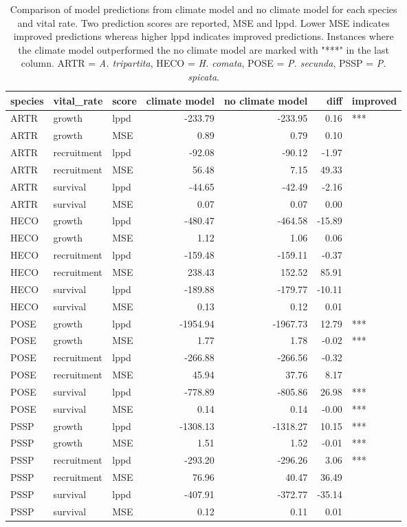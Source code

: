 \begin{table}[ht]
\centering
\caption{Comparison of model predictions from climate model and no climate model for each species and vital rate.  Two prediction scores are reported, MSE and lppd. Lower MSE indicates improved predictions whereas higher lppd indicates improved predictions.  Instances where the climate model outperformed the no climate model are marked with "***" in the last column. ARTR = \textit{A. tripartita}, HECO = \textit{H. comata}, POSE = \textit{P. secunda}, PSSP = \textit{P. spicata}.} 
\label{table:overallPreds}
\begin{tabular}{lllrrrl}
  \hline
species & vital\_rate & score & climate model & no climate model & diff & improved \\ 
  \hline
ARTR & growth & lppd & -233.79 & -233.95 & 0.16 & *** \\ 
  ARTR & growth & MSE & 0.89 & 0.79 & 0.10 &  \\ 
  ARTR & recruitment & lppd & -92.08 & -90.12 & -1.97 &  \\ 
  ARTR & recruitment & MSE & 56.48 & 7.15 & 49.33 &  \\ 
  ARTR & survival & lppd & -44.65 & -42.49 & -2.16 &  \\ 
  ARTR & survival & MSE & 0.07 & 0.07 & 0.00 &  \\ 
  HECO & growth & lppd & -480.47 & -464.58 & -15.89 &  \\ 
  HECO & growth & MSE & 1.12 & 1.06 & 0.06 &  \\ 
  HECO & recruitment & lppd & -159.48 & -159.11 & -0.37 &  \\ 
  HECO & recruitment & MSE & 238.43 & 152.52 & 85.91 &  \\ 
  HECO & survival & lppd & -189.88 & -179.77 & -10.11 &  \\ 
  HECO & survival & MSE & 0.13 & 0.12 & 0.01 &  \\ 
  POSE & growth & lppd & -1954.94 & -1967.73 & 12.79 & *** \\ 
  POSE & growth & MSE & 1.77 & 1.78 & -0.02 & *** \\ 
  POSE & recruitment & lppd & -266.88 & -266.56 & -0.32 &  \\ 
  POSE & recruitment & MSE & 45.94 & 37.76 & 8.17 &  \\ 
  POSE & survival & lppd & -778.89 & -805.86 & 26.98 & *** \\ 
  POSE & survival & MSE & 0.14 & 0.14 & -0.00 & *** \\ 
  PSSP & growth & lppd & -1308.13 & -1318.27 & 10.15 & *** \\ 
  PSSP & growth & MSE & 1.51 & 1.52 & -0.01 & *** \\ 
  PSSP & recruitment & lppd & -293.20 & -296.26 & 3.06 & *** \\ 
  PSSP & recruitment & MSE & 76.96 & 40.47 & 36.49 &  \\ 
  PSSP & survival & lppd & -407.91 & -372.77 & -35.14 &  \\ 
  PSSP & survival & MSE & 0.12 & 0.11 & 0.01 &  \\ 
   \hline
\end{tabular}
\end{table}
